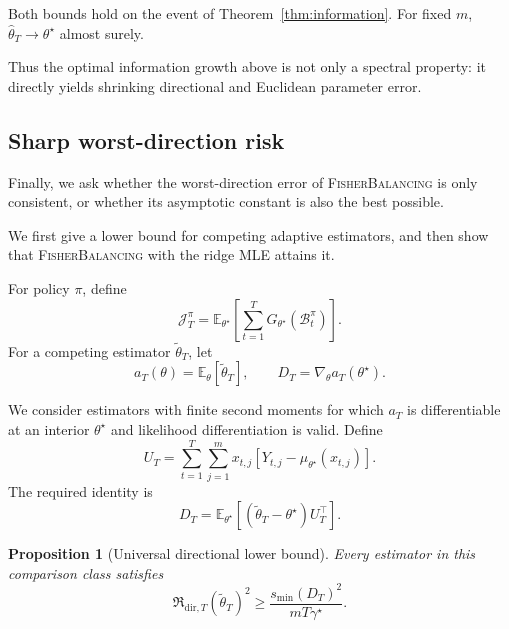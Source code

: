 \documentclass[10pt,twoside,letterpaper]{article}
\newtheorem{proposition}{Proposition}
\newcommand{\E}{\mathbb E}
\newcommand{\FB}{\textnormal{\textsc{FisherBalancing}}}
\newcommand{\thetahat}{\widehat\theta}
\begin{document}
Both bounds hold on the event of
Theorem~\ref{thm:information}. For fixed $m$,
$\thetahat_T\to\theta^\star$ almost surely.

Thus the optimal information growth above is not only a spectral
property: it directly yields shrinking directional and Euclidean
parameter error.


\subsection{Sharp worst-direction risk}
\label{sec:sharp-risk}

Finally, we ask whether the worst-direction error of \FB{} is only
consistent, or whether its asymptotic constant is also the best possible.

We first give a lower bound for competing adaptive estimators, and then
show that \FB{} with the ridge MLE attains it.

For policy $\pi$, define
\begin{equation}
\mathcal J_T^\pi
=
\E_{\theta^\star}
\left[
\sum_{t=1}^{T}
G_{\theta^\star}(\mathcal B_t^\pi)
\right].
\end{equation}
For a competing estimator $\widetilde\theta_T$, let
\begin{equation}
a_T(\theta)
=
\E_\theta[\widetilde\theta_T],
\qquad
D_T
=
\nabla_\theta a_T(\theta^\star).
\end{equation}

We consider estimators with finite second moments for which $a_T$ is
differentiable at an interior $\theta^\star$ and likelihood
differentiation is valid. Define
\begin{equation}
U_T
=
\sum_{t=1}^{T}\sum_{j=1}^{m}
x_{t,j}
\left[
Y_{t,j}
-
\mu_{\theta^\star}(x_{t,j})
\right].
\end{equation}
The required identity is
\begin{equation}
D_T
=
\E_{\theta^\star}
\left[
(\widetilde\theta_T-\theta^\star)
U_T^\top
\right].
\label{eq:mean-score-identity}
\end{equation}

\begin{proposition}[Universal directional lower bound]
\label{prop:risk-lower}
Every estimator in this comparison class satisfies
\begin{equation}
\mathfrak R_{\mathrm{dir},T}
(\widetilde\theta_T)^2
\ge
\frac{
s_{\min}(D_T)^2
}{
mT\gamma^\star
}.
\label{eq:risk-lower-general}
\end{equation}
\end{proposition}
\end{document}
